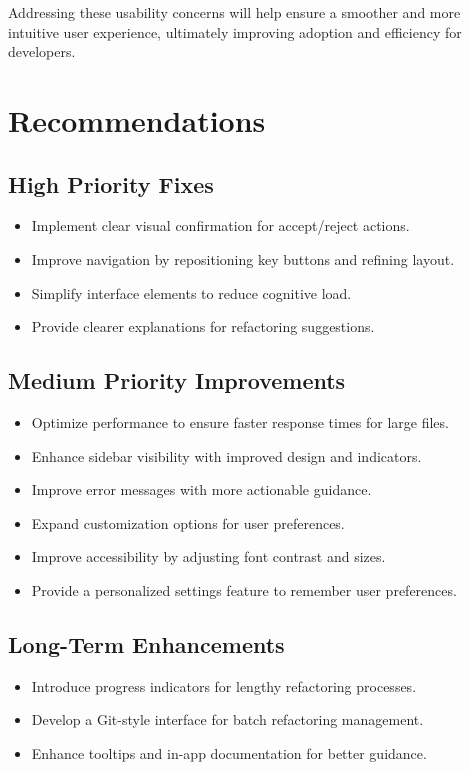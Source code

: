 \documentclass{article}
\begin{document}
Addressing these usability concerns will help ensure a smoother and more intuitive user experience, ultimately improving adoption and efficiency for developers.

\newpage
\section{Recommendations}

\subsection{High Priority Fixes}
\begin{itemize}
\item Implement clear visual confirmation for accept/reject actions.
\item Improve navigation by repositioning key buttons and refining layout.
\item Simplify interface elements to reduce cognitive load.
\item Provide clearer explanations for refactoring suggestions.
\end{itemize}

\subsection{Medium Priority Improvements}
\begin{itemize}
\item Optimize performance to ensure faster response times for large files.
\item Enhance sidebar visibility with improved design and indicators.
\item Improve error messages with more actionable guidance.
\item Expand customization options for user preferences.
\item Improve accessibility by adjusting font contrast and sizes.
\item Provide a personalized settings feature to remember user preferences.
\end{itemize}

\subsection{Long-Term Enhancements}
\begin{itemize}
\item Introduce progress indicators for lengthy refactoring processes.
\item Develop a Git-style interface for batch refactoring management.
\item Enhance tooltips and in-app documentation for better guidance.
\end{itemize}
\end{document}
